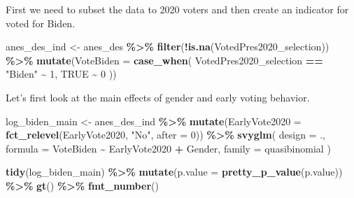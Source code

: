 \documentclass[
]{krantz}
\makeatletter
\newenvironment{Shaded}{\begin{snugshade}}{\end{snugshade}}
\newcommand{\AttributeTok}[1]{\textcolor[rgb]{0.27,0.27,0.27}{#1}}
\newcommand{\ConstantTok}[1]{\textcolor[rgb]{0.37,0.37,0.37}{#1}}
\newcommand{\DecValTok}[1]{\textcolor[rgb]{0.06,0.06,0.06}{#1}}
\newcommand{\FunctionTok}[1]{\textcolor[rgb]{0.27,0.27,0.27}{\textbf{#1}}}
\newcommand{\NormalTok}[1]{#1}
\newcommand{\OtherTok}[1]{\textcolor[rgb]{0.37,0.37,0.37}{#1}}
\newcommand{\SpecialCharTok}[1]{\textcolor[rgb]{0.43,0.43,0.43}{\textbf{#1}}}
\newcommand{\StringTok}[1]{\textcolor[rgb]{0.5,0.5,0.5}{#1}}
\newenvironment{kframe}{%
\medskip{}
\setlength{\fboxsep}{.8em}
 \def\at@end@of@kframe{}%
 \ifinner\ifhmode%
  \def\at@end@of@kframe{\end{minipage}}%
  \begin{minipage}{\columnwidth}%
 \fi\fi%
 \def\FrameCommand##1{\hskip\@totalleftmargin \hskip-\fboxsep
 \colorbox{shadecolor}{##1}\hskip-\fboxsep
     \hskip-\linewidth \hskip-\@totalleftmargin \hskip\columnwidth}%
 \MakeFramed {\advance\hsize-\width
   \@totalleftmargin\z@ \linewidth\hsize
   \@setminipage}}%
 {\par\unskip\endMakeFramed%
 \at@end@of@kframe}
\renewenvironment{Shaded}{\begin{kframe}}{\end{kframe}}
\makeatother
\begin{document}
First we need to subset the data to 2020 voters and then create an indicator for voted for Biden.

\begin{Shaded}
\begin{Highlighting}[]
\NormalTok{anes\_des\_ind }\OtherTok{\textless{}{-}}\NormalTok{ anes\_des }\SpecialCharTok{\%\textgreater{}\%}
  \FunctionTok{filter}\NormalTok{(}\SpecialCharTok{!}\FunctionTok{is.na}\NormalTok{(VotedPres2020\_selection)) }\SpecialCharTok{\%\textgreater{}\%}
  \FunctionTok{mutate}\NormalTok{(}\AttributeTok{VoteBiden =} \FunctionTok{case\_when}\NormalTok{(}
\NormalTok{    VotedPres2020\_selection }\SpecialCharTok{==} \StringTok{"Biden"} \SpecialCharTok{\textasciitilde{}} \DecValTok{1}\NormalTok{,}
    \ConstantTok{TRUE} \SpecialCharTok{\textasciitilde{}} \DecValTok{0}
\NormalTok{  ))}
\end{Highlighting}
\end{Shaded}

Let's first look at the main effects of gender and early voting behavior.

\begin{Shaded}
\begin{Highlighting}[]
\NormalTok{log\_biden\_main }\OtherTok{\textless{}{-}}\NormalTok{ anes\_des\_ind }\SpecialCharTok{\%\textgreater{}\%}
  \FunctionTok{mutate}\NormalTok{(}\AttributeTok{EarlyVote2020 =} \FunctionTok{fct\_relevel}\NormalTok{(EarlyVote2020, }\StringTok{"No"}\NormalTok{, }\AttributeTok{after =} \DecValTok{0}\NormalTok{)) }\SpecialCharTok{\%\textgreater{}\%}
  \FunctionTok{svyglm}\NormalTok{(}
    \AttributeTok{design =}\NormalTok{ .,}
    \AttributeTok{formula =}\NormalTok{ VoteBiden }\SpecialCharTok{\textasciitilde{}}\NormalTok{ EarlyVote2020 }\SpecialCharTok{+}\NormalTok{ Gender,}
    \AttributeTok{family =}\NormalTok{ quasibinomial}
\NormalTok{  )}
\end{Highlighting}
\end{Shaded}

\begin{Shaded}
\begin{Highlighting}[]
\FunctionTok{tidy}\NormalTok{(log\_biden\_main) }\SpecialCharTok{\%\textgreater{}\%}
  \FunctionTok{mutate}\NormalTok{(}\AttributeTok{p.value =} \FunctionTok{pretty\_p\_value}\NormalTok{(p.value)) }\SpecialCharTok{\%\textgreater{}\%}
  \FunctionTok{gt}\NormalTok{() }\SpecialCharTok{\%\textgreater{}\%}
  \FunctionTok{fmt\_number}\NormalTok{()}
\end{Highlighting}
\end{Shaded}
\end{document}
